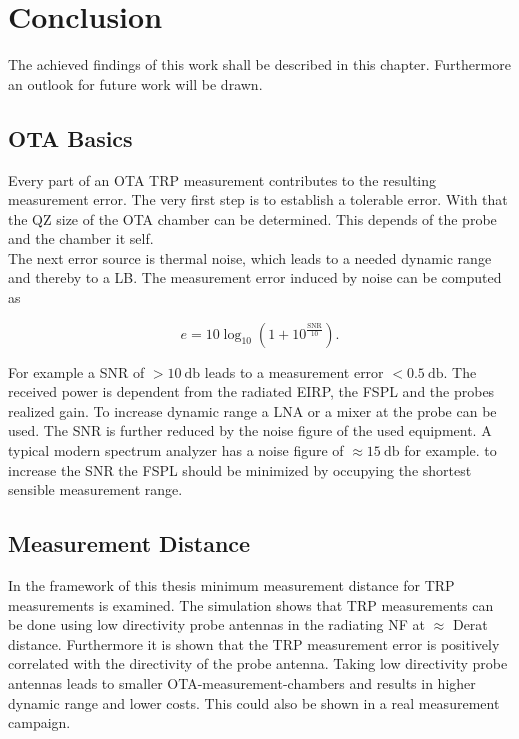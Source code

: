 \chapter{Conclusion}

The achieved findings of this work shall be described in this chapter. Furthermore an outlook for future work will be drawn.

\section{OTA Basics}

Every part of an \acf{OTA} \acf{TRP} measurement contributes to the resulting measurement error. The very first step is to establish a tolerable error. With that the \acf{QZ} size of the \ac{OTA} chamber can be determined. This depends of the probe and the chamber it self.\\
The next error source is thermal noise, which leads to a needed dynamic range and thereby to a \acf{LB}. The measurement error induced by noise can be computed as 

\begin{equation}
e = 10\log_{10}\left(1+10^{\frac{\text{SNR}}{10}}\right).
\end{equation}

For example a \acf{SNR} of $>\SI{10}{\decibel}$ leads to a measurement error $<\SI{0.5}{\decibel}$. The received power is dependent from the radiated \ac{EIRP}, the \acf{FSPL} and the probes realized gain. To increase dynamic range a \acf{LNA} or a mixer at the probe can be used. The \ac{SNR} is further reduced by the noise figure of the used equipment. A typical modern spectrum analyzer has a noise figure of $\approx\SI{15}{\decibel}$ for example. to increase the \ac{SNR} the \ac{FSPL} should be minimized by occupying the shortest sensible measurement range.

\section{Measurement Distance}

In the framework of this thesis minimum measurement distance for \acf{TRP} measurements is examined. The simulation shows that \ac{TRP} measurements can be done using low directivity probe antennas in the radiating \acf{NF} at $\approx$ Derat distance. Furthermore it is shown that the \ac{TRP} measurement error is positively correlated with the directivity of the probe antenna. Taking low directivity probe antennas leads to smaller \ac{OTA}-measurement-chambers and results in higher dynamic range and lower costs. This could also be shown in a real measurement campaign.

